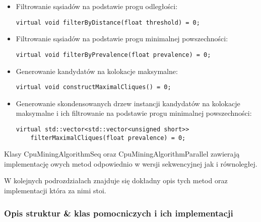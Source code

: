 \documentclass[12pt]{article}
\begin{document}
\begin{itemize}
\item
Filtrowanie sąsiadów na podstawie progu odległości:
\begin{lstlisting}
virtual void filterByDistance(float threshold) = 0;
\end{lstlisting}

\item
Filtrowanie sąsiadów na podstawie progu minimalnej powszechności:
\begin{lstlisting}
virtual void filterByPrevalence(float prevalence) = 0;
\end{lstlisting}

\item
Generowanie kandydatów na kolokacje maksymalne:
\begin{lstlisting}
virtual void constructMaximalCliques() = 0;
\end{lstlisting}

\item
Generowanie skondensowanych drzew instancji kandydatów na kolokacje maksymalne i ich filtrowanie na podstawie progu minimalnej powszechności:
\begin{lstlisting}
virtual std::vector<std::vector<unsigned short>> 
    filterMaximalCliques(float prevalence) = 0;
\end{lstlisting}
\end{itemize}

Klasy CpuMiningAlgorithmSeq oraz CpuMiningAlgorithmParallel zawierają implementację owych metod odpowiednio w wersji sekwencyjnej jak i równoległej.

W kolejnych podrozdziałach znajduje się dokładny opis tych metod oraz implementacji która za nimi stoi.

\subsubsection{Opis struktur \& klas pomocniczych i ich implementacji}
    
\end{document}
